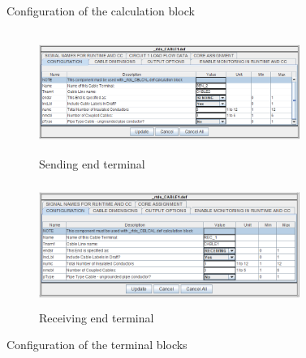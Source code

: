 \begin{figure}[H]
\centering
{}\hfill
{}
\caption{Configuration of the calculation block}
\label{fig}
\end{figure}

\begin{figure}[H]
\centering
\begin{subfigure}{0.5\textwidth}
  \centering
  \includegraphics[height = 4cm,width = 8.5cm]{Diagrams/Chapter_3/CableParaBlock_sen_term.PNG}
  \caption{Sending end terminal}
  \label{fig:CableParaBlock_sen_term}
\end{subfigure}%
\begin{subfigure}{0.5\textwidth}
  \centering
  \includegraphics[height = 4cm,width = 8.5cm]{Diagrams/Chapter_3/CableParaBlock_rec_term.PNG}
  \caption{Receiving end terminal}
  \label{fig:CableParaBlock_rec_term}
\end{subfigure}
\caption{Configuration of the terminal blocks}
\label{fig:Terminal_options}
\end{figure}

